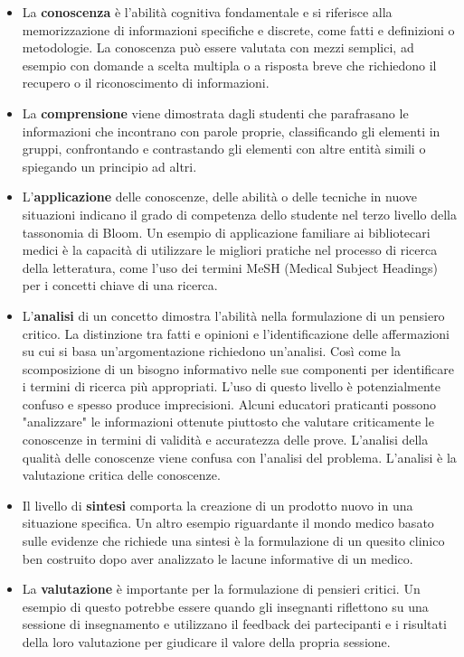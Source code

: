 \begin{itemize}
  \item La \textbf{conoscenza} è l'abilità cognitiva fondamentale e si riferisce alla memorizzazione di informazioni specifiche e discrete, come fatti e definizioni o metodologie.  La conoscenza può essere valutata con mezzi semplici, ad esempio con domande a scelta multipla o a risposta breve che richiedono il recupero o il riconoscimento di informazioni.

  \item La \textbf{comprensione} viene dimostrata dagli studenti che parafrasano le informazioni che incontrano con parole proprie, classificando gli elementi in gruppi, confrontando e contrastando gli elementi con altre entità simili o spiegando un principio ad altri.

  \item L'\textbf{applicazione} delle conoscenze, delle abilità o delle tecniche in nuove situazioni indicano il grado di competenza dello studente nel terzo livello della tassonomia di Bloom. Un esempio di applicazione familiare ai bibliotecari medici è la capacità di utilizzare le migliori pratiche nel processo di ricerca della letteratura, come l'uso dei termini MeSH (Medical Subject Headings) per i concetti chiave di una ricerca.

  \item L'\textbf{analisi} di un concetto dimostra l'abilità nella formulazione di un pensiero critico. La distinzione tra fatti e opinioni e l'identificazione delle affermazioni su cui si basa un'argomentazione richiedono un'analisi. Così come la scomposizione di un bisogno informativo nelle sue componenti per identificare i termini di ricerca più appropriati.  L'uso di questo livello è potenzialmente confuso e spesso produce imprecisioni. Alcuni educatori praticanti possono "analizzare" le informazioni ottenute piuttosto che valutare criticamente le conoscenze in termini di validità e accuratezza delle prove. L'analisi della qualità delle conoscenze viene confusa con l'analisi del problema. L'analisi è la valutazione critica delle conoscenze.

  \item Il livello di \textbf{sintesi} comporta la creazione di un prodotto nuovo in una situazione specifica. Un altro esempio riguardante il mondo medico basato sulle evidenze che richiede una sintesi è la formulazione di un quesito clinico ben costruito dopo aver analizzato le lacune informative di un medico.

  \item La \textbf{valutazione} è importante per la formulazione di pensieri critici. Un esempio di questo potrebbe essere quando gli insegnanti riflettono su una sessione di insegnamento e utilizzano il feedback dei partecipanti e i risultati della loro valutazione per giudicare il valore della propria sessione.
\end{itemize}
